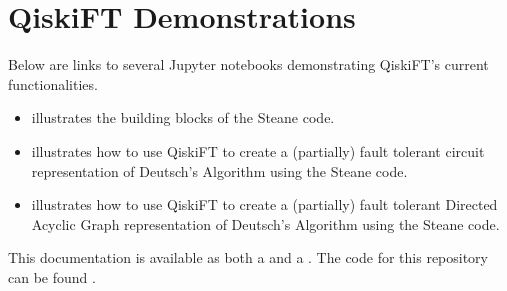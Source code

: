 \documentclass[letterpaper,10pt,english]{sphinxmanual}
\begin{document}
\chapter{QiskiFT Demonstrations}
\label{\detokenize{Demos:qiskift-demonstrations}}\label{\detokenize{Demos::doc}}
Below are links to several Jupyter notebooks demonstrating QiskiFT’s current functionalities.
\begin{itemize}
\item {} 
 illustrates the building blocks of the Steane code.

\item {} 
 illustrates how to use QiskiFT to create a (partially) fault tolerant circuit representation of Deutsch’s Algorithm using the Steane code.

\item {} 
 illustrates how to use QiskiFT to create a (partially) fault tolerant Directed Acyclic Graph representation of Deutsch’s Algorithm using the Steane code.

\end{itemize}

This documentation is available as both a  and a . The code for this repository can be found .


\renewcommand{\indexname}{Python Module Index}
\begin{sphinxtheindex}
\let\bigletter\sphinxstyleindexlettergroup
\bigletter{b}
\item\relax{}
\indexspace
\bigletter{s}
\item\relax{}
\end{sphinxtheindex}

\renewcommand{\indexname}{Index}
\printindex
\end{document}
